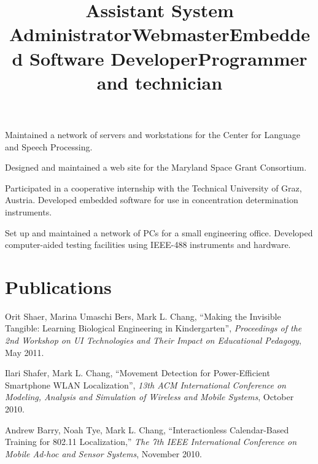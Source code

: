 \documentclass[line]{res}
\begin{document}
\begin{resume}
	\title{Assistant System Administrator} 
	\begin{position}
		Maintained a network of servers and workstations for the Center for Language and Speech Processing. 
	\end{position}
	
	\title{Webmaster} 
	\begin{position}
		Designed and maintained a web site for the Maryland Space Grant Consortium. 
	\end{position}
	
	\title{Embedded Software Developer} 
	  
	\begin{position}
		Participated in a cooperative internship with the Technical University of Graz, Austria. Developed embedded software for use in concentration determination instruments. 
	\end{position}
	
	\title{Programmer and technician} 
	  
	\begin{position}
		Set up and maintained a network of PCs for a small engineering office. Developed computer-aided testing facilities using IEEE-488 instruments and hardware. 
	\end{position}
	
	\section{\sc Publications}
	
	Orit Shaer, Marina Umaschi Bers, Mark L. Chang, ``Making the Invisible Tangible: Learning Biological Engineering in Kindergarten'', \textit{Proceedings of the 2nd Workshop on UI Technologies and Their Impact on Educational Pedagogy}, May 2011.
	
	Ilari Shafer, Mark L. Chang, ``Movement Detection for Power-Efficient Smartphone WLAN Localization'', \textit{13th ACM International Conference on Modeling, Analysis and Simulation of Wireless and Mobile Systems}, October 2010.
	
	Andrew Barry, Noah Tye, Mark L. Chang, ``Interactionless Calendar-Based Training for 802.11 Localization,'' \textit{The 7th IEEE International Conference on Mobile Ad-hoc and Sensor Systems}, November 2010.
	

\end{resume}
\end{document}
